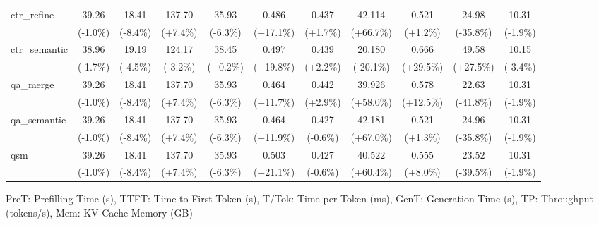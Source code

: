 \begin{table}[t]
{\begin{tabular}{l|cccccccccc}
    ctr\_refine & 39.26 & 18.41 & 137.70 & 35.93 & 0.486 & 0.437 & 42.114 & 0.521 & 24.98 & 10.31 \\
     & {\tiny\color{green!60!black}(-1.0\%)} & {\tiny\color{green!60!black}(-8.4\%)} & {\tiny\color{red!70!black}(+7.4\%)} & {\tiny\color{green!60!black}(-6.3\%)} & {\tiny\color{red!70!black}(+17.1\%)} & {\tiny\color{red!70!black}(+1.7\%)} & {\tiny\color{red!70!black}(+66.7\%)} & {\tiny\color{red!70!black}(+1.2\%)} & {\tiny\color{red!70!black}(-35.8\%)} & {\tiny\color{green!60!black}(-1.9\%)} \\
    ctr\_semantic & 38.96 & 19.19 & 124.17 & 38.45 & 0.497 & 0.439 & 20.180 & 0.666 & 49.58 & 10.15 \\
     & {\tiny\color{green!60!black}(-1.7\%)} & {\tiny\color{green!60!black}(-4.5\%)} & {\tiny\color{green!60!black}(-3.2\%)} & {\tiny\color{red!70!black}(+0.2\%)} & {\tiny\color{red!70!black}(+19.8\%)} & {\tiny\color{red!70!black}(+2.2\%)} & {\tiny\color{green!60!black}(-20.1\%)} & {\tiny\color{red!70!black}(+29.5\%)} & {\tiny\color{green!60!black}(+27.5\%)} & {\tiny\color{green!60!black}(-3.4\%)} \\
    qa\_merge & 39.26 & 18.41 & 137.70 & 35.93 & 0.464 & 0.442 & 39.926 & 0.578 & 22.63 & 10.31 \\
     & {\tiny\color{green!60!black}(-1.0\%)} & {\tiny\color{green!60!black}(-8.4\%)} & {\tiny\color{red!70!black}(+7.4\%)} & {\tiny\color{green!60!black}(-6.3\%)} & {\tiny\color{red!70!black}(+11.7\%)} & {\tiny\color{red!70!black}(+2.9\%)} & {\tiny\color{red!70!black}(+58.0\%)} & {\tiny\color{red!70!black}(+12.5\%)} & {\tiny\color{red!70!black}(-41.8\%)} & {\tiny\color{green!60!black}(-1.9\%)} \\
    qa\_semantic & 39.26 & 18.41 & 137.70 & 35.93 & 0.464 & 0.427 & 42.181 & 0.521 & 24.96 & 10.31 \\
     & {\tiny\color{green!60!black}(-1.0\%)} & {\tiny\color{green!60!black}(-8.4\%)} & {\tiny\color{red!70!black}(+7.4\%)} & {\tiny\color{green!60!black}(-6.3\%)} & {\tiny\color{red!70!black}(+11.9\%)} & {\tiny\color{green!60!black}(-0.6\%)} & {\tiny\color{red!70!black}(+67.0\%)} & {\tiny\color{red!70!black}(+1.3\%)} & {\tiny\color{red!70!black}(-35.8\%)} & {\tiny\color{green!60!black}(-1.9\%)} \\
    qsm & 39.26 & 18.41 & 137.70 & 35.93 & 0.503 & 0.427 & 40.522 & 0.555 & 23.52 & 10.31 \\
     & {\tiny\color{green!60!black}(-1.0\%)} & {\tiny\color{green!60!black}(-8.4\%)} & {\tiny\color{red!70!black}(+7.4\%)} & {\tiny\color{green!60!black}(-6.3\%)} & {\tiny\color{red!70!black}(+21.1\%)} & {\tiny\color{green!60!black}(-0.6\%)} & {\tiny\color{red!70!black}(+60.4\%)} & {\tiny\color{red!70!black}(+8.0\%)} & {\tiny\color{red!70!black}(-39.5\%)} & {\tiny\color{green!60!black}(-1.9\%)} \\
    \bottomrule
    \end{tabular}%
    }
    \vspace{0.1cm}
    \footnotesize{PreT: Prefilling Time (s), TTFT: Time to First Token (s), T/Tok: Time per Token (ms), GenT: Generation Time (s), TP: Throughput (tokens/s), Mem: KV Cache Memory (GB)}
\end{table}

